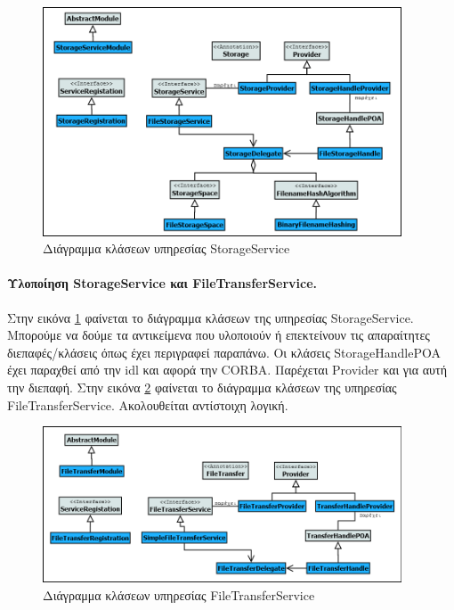 \begin{figure}[htbp]
  \begin{center}
    \includegraphics[width=0.95\textwidth]{Figures/Demo/StorageService_ClassDiagram.png}
  \end{center}
  \caption{Διάγραμμα κλάσεων υπηρεσίας StorageService}
  \label{fig:StorageService}
\end{figure}

\paragraph{Υλοποίηση StorageService και FileTransferService.} 
Στην εικόνα \ref{fig:StorageService} φαίνεται το διάγραμμα κλάσεων 
της υπηρεσίας StorageService. Μπορούμε να δούμε τα αντικείμενα που 
υλοποιούν ή επεκτείνουν τις απαραίτητες διεπαφές/κλάσεις όπως έχει 
περιγραφεί παραπάνω. Οι κλάσεις StorageHandlePOA έχει παραχθεί από 
την idl και αφορά την CORBA. Παρέχεται Provider και για αυτή την 
διεπαφή. Στην εικόνα \ref{fig:FileTransferService} φαίνεται το 
διάγραμμα κλάσεων της υπηρεσίας FileTransferService. Ακολουθείται 
αντίστοιχη λογική.

\begin{figure}[htbp]
  \begin{center}
    \includegraphics[width=0.95\textwidth]{Figures/Demo/FileTransferService_ClassDiagram.png}
  \end{center}
  \caption{Διάγραμμα κλάσεων υπηρεσίας FileTransferService}
  \label{fig:FileTransferService}
\end{figure}

